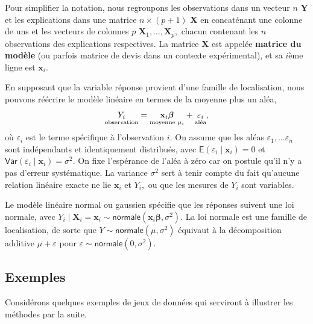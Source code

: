 \documentclass[
  11pt,
  letterpaper,
]{scrbook}
\theoremstyle{plain}
\theoremstyle{plain}
\theoremstyle{definition}
\theoremstyle{definition}
\theoremstyle{remark}
\begin{document}
Pour simplifier la notation, nous regroupons les observations dans un
vecteur \(n\) \(\boldsymbol{Y}\) et les explications dans une matrice
\(n \times (p+1)\) \(\mathbf{X}\) en concaténant une colonne de uns et
les vecteurs de colonnes \(p\)
\(\boldsymbol{X}_1, \ldots, \boldsymbol{X}_p,\) chacun contenant les
\(n\) observations des explications respectives. La matrice
\(\mathbf{X}\) est appelée \textbf{matrice du modèle} (ou parfois
matrice de devis dans un contexte expérimental), et sa \(i\)ème ligne
est \(\mathbf{x}_i.\)

En supposant que la variable réponse provient d'une famille de
localisation, nous pouvons réécrire le modèle linéaire en termes de la
moyenne plus un aléa, \begin{align*}
\underset{\text{observation}\vphantom{\mu_i}}{Y_i} = \underset{\text{moyenne } \mu_i}{\vphantom{Y_i}\mathbf{x}_i\boldsymbol{\beta}} + \underset{\text{aléa}\vphantom{\mu_i}}{\vphantom{Y_i}\varepsilon_i},
\end{align*} où \(\varepsilon_i\) est le terme spécifique à
l'observation \(i.\) On assume que les aléas
\(\varepsilon_1, \ldots \varepsilon_n\) sont indépendants et
identiquement distribués, avec
\(\mathsf{E}(\varepsilon_i \mid \mathbf{x}_i) = 0\) et
\(\mathsf{Var}(\varepsilon_i \mid \mathbf{x}_i) = \sigma^2.\) On fixe
l'espérance de l'aléa à zéro car on postule qu'il n'y a pas d'erreur
systématique. La variance \(\sigma^2\) sert à tenir compte du fait
qu'aucune relation linéaire exacte ne lie \(\mathbf{x}_i\) et \(Y_i,\)
ou que les mesures de \(Y_i\) sont variables.

Le modèle linéaire normal ou gaussien spécifie que les réponses suivent
une loi normale, avec
\(Y_i \mid \boldsymbol{X}_i=\boldsymbol{x}_i \sim \mathsf{normale}(\mathbf{x}_i\boldsymbol{\beta}, \sigma^2).\)
La loi normale est une famille de localisation, de sorte que
\(Y \sim \mathsf{normale}(\mu, \sigma^2)\) équivaut à la décomposition
additive \(\mu + \varepsilon\) pour
\(\varepsilon \sim \mathsf{normale}(0, \sigma^2).\)

\subsection{Exemples}\label{exemples-1}

Considérons quelques exemples de jeux de données qui serviront à
illustrer les méthodes par la suite.
\end{document}
